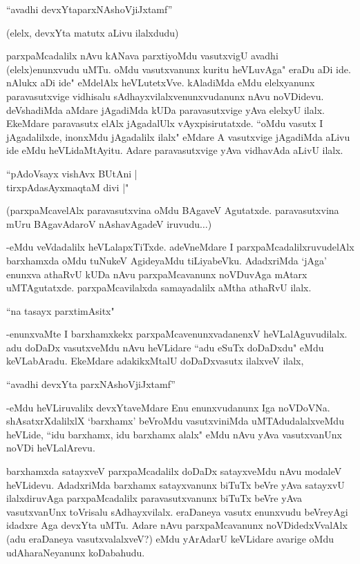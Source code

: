 \begin{shloka}
``avadhi devxYtaparxNAshoVjiJxtamf''
\end{shloka}

(elelx, devxYta matutx aLivu ilalxdudu)

parxpaMcadalilx nAvu kANava parxtiyoMdu vasutxvigU avadhi (elelx)enunxvudu uMTu. oMdu vasutxvanunx kuritu heVLuvAga" eraDu aDi ide. nAlukx aDi ide" eMdelAlx heVLutetxVve. kAladiMda eMdu elelxyanunx paravasutxvige vidhisalu sAdhayxvilalxvenunxvudanunx nAvu noVDidevu. deVshadiMda aMdare jAgadiMda kUDa paravasutxvige yAva elelxyU ilalx. EkeMdare paravasutx elAlx jAgadalUlx vAyxpisirutatxde. ``oMdu vasutx I jAgadalilxde, inonxMdu jAgadalilx ilalx" eMdare A vasutxvige jAgadiMda aLivu ide eMdu heVLidaMtAyitu. Adare paravasutxvige yAva vidhavAda aLivU ilalx.

\begin{shloka}
``pAdoV\s sayx vishAvx BUtAni |\\
tirxpAdasAyxmaqtaM divi |"
\end{shloka}
 
 (parxpaMcavelAlx paravasutxvina oMdu BAgaveV Agutatxde. paravasutxvina mUru BAgavAdaroV nAshavAgadeV iruvudu$\ldots$)
 
 
 -eMdu veVdadalilx heVLalapxTiTxde. adeVneMdare I parxpaMcadalilxruvudelAlx barxhamxda oMdu tuNukeV AgideyaMdu tiLiyabeVku. AdadxriMda `jAga' enunxva athaRvU kUDa nAvu parxpaMcavanunx noVDuvAga mAtarx uMTAgutatxde. parxpaMcavilalxda samayadalilx aMtha athaRvU ilalx.
 
 
 \begin{shloka}
 ``na tasayx parxtimA\s sitx"
\end{shloka} 

-enunxvaMte I barxhamxkekx parxpaMcavenunxvadanenxV heVLalAguvudilalx. adu doDaDx vasutxveMdu nAvu heVLidare ``adu eSuTx doDaDxdu" eMdu keVLabAradu. EkeMdare adakikxMtalU doDaDxvasutx ilalxveV ilalx, 

\begin{shloka}
``avadhi devxYta parxNAshoVjiJxtamf''
\end{shloka}

-eMdu heVLiruvalilx devxYtaveMdare Enu enunxvudanunx Iga noVDoVNa. shAsatxrXdalilxlX `barxhamx' beVroMdu vasutxviniMda uMTAdudalalxveMdu heVLide, ``idu barxhamx, idu barxhamx alalx" eMdu nAvu yAva vasutxvanUnx noVDi heVLalArevu. 


barxhamxda satayxveV parxpaMcadalilx doDaDx satayxveMdu nAvu modaleV heVLidevu. AdadxriMda barxhamx satayxvanunx biTuTx beVre yAva satayxvU ilalxdiruvAga parxpaMcadalilx paravasutxvanunx biTuTx beVre yAva vasutxvanUnx toVrisalu sAdhayxvilalx. eraDaneya vasutx enunxvudu beVreyAgi idadxre Aga devxYta uMTu. Adare nAvu parxpaMcavanunx noVDidedxVvalAlx (adu eraDaneya vasutxvalalxveV?) eMdu yArAdarU keVLidare avarige oMdu udAharaNeyanunx koDabahudu. 

